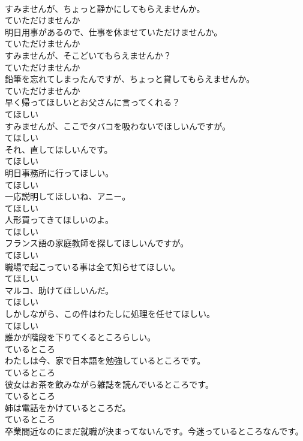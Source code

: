 \documentclass[8pt]{extreport}
\begin{document}
\begin{CJK}{UTF8}{min}
\\	すみませんが、ちょっと静かにしてもらえませんか。	
\\	ていただけませんか	
\\	明日用事があるので、仕事を休ませていただけませんか。	
\\	ていただけませんか	
\\	すみませんが、そこどいてもらえませんか？	
\\	ていただけませんか	
\\	鉛筆を忘れてしまったんですが、ちょっと貸してもらえませんか。	
\\	ていただけませんか	
\\	早く帰ってほしいとお父さんに言ってくれる？	
\\	てほしい	
\\	すみませんが、ここでタバコを吸わないでほしいんですが。	
\\	てほしい	
\\	それ、直してほしいんです。	
\\	てほしい	
\\	明日事務所に行ってほしい。	
\\	てほしい	
\\	一応説明してほしいね、アニー。	
\\	てほしい	
\\	人形買ってきてほしいのよ。	
\\	てほしい	
\\	フランス語の家庭教師を探してほしいんですが。	
\\	てほしい	
\\	職場で起こっている事は全て知らせてほしい。	
\\	てほしい	
\\	マルコ、助けてほしいんだ。	
\\	てほしい	
\\	しかしながら、この件はわたしに処理を任せてほしい。	
\\	てほしい	
\\	誰かが階段を下りてくるところらしい。	
\\	ているところ	
\\	わたしは今、家で日本語を勉強しているところです。	
\\	ているところ	
\\	彼女はお茶を飲みながら雑誌を読んでいるところです。	
\\	ているところ	
\\	姉は電話をかけているところだ。	
\\	ているところ	
\\	卒業間近なのにまだ就職が決まってないんです。今迷っているところなんです。	

\end{CJK}
\end{document}
